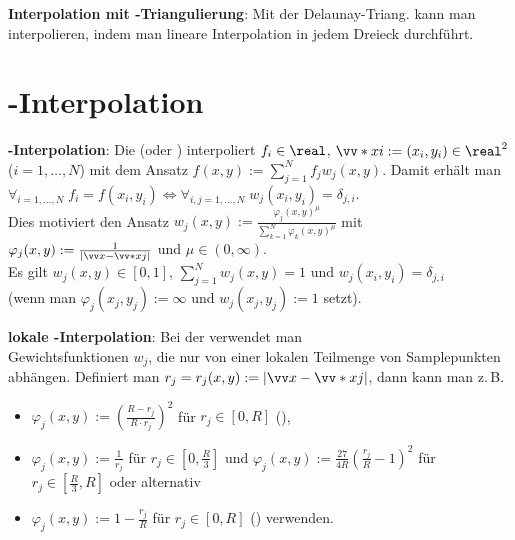 \textbf{Interpolation mit -Triangulierung}:
Mit der Delaunay-Triang. kann man interpolieren,
indem man lineare Interpolation in jedem Dreieck durchführt.

\section{%
    -Interpolation%
}

\textbf{-Interpolation}:
Die  (oder )
interpoliert $f_i \in \real$, $\vecs{x}{i} := (x_i, y_i) \in \real^2$ ($i = 1, \dotsc, N$)
mit dem Ansatz $f(x, y) := \sum_{j=1}^N f_j w_j(x, y)$.
Damit erhält man $\forall_{i=1,\dotsc,N}\; f_i = f(x_i, y_i) \iff
\forall_{i,j=1,\dotsc,N}\; w_j(x_i, y_i) = \delta_{j,i}$.\\
Dies motiviert den Ansatz
$w_j(x, y) := \frac{\varphi_j(x, y)^\mu}{\sum_{k=1}^N \varphi_k(x, y)^\mu}$ mit
$\varphi_j(x, y) := \frac{1}{|\vec{x} - \vecs{x}{j}|}$ und $\mu \in (0, \infty)$.\\
Es gilt $w_j(x, y) \in [0, 1]$, $\sum_{j=1}^N w_j(x, y) = 1$ und $w_j(x_i, y_i) = \delta_{j,i}$\\
(wenn man $\varphi_j(x_j, y_j) := \infty$ und $w_j(x_j, y_j) := 1$ setzt).

\linie

\textbf{lokale -Interpolation}:
Bei der  verwendet man\\
Gewichtsfunktionen $w_j$, die nur von einer lokalen Teilmenge von Samplepunkten abhängen.
Definiert man $r_j = r_j(x, y) := |\vec{x} - \vecs{x}{j}|$, dann
kann man z.\,B.
\begin{itemize}
    \item
    $\varphi_j(x, y) := \left(\frac{R - r_j}{R \cdot r_j}\right)^2$ für $r_j \in [0, R]$
    (),

    \item
    $\varphi_j(x, y) := \frac{1}{r_j}$ für $r_j \in [0, \frac{R}{3}]$ und
    $\varphi_j(x, y) := \frac{27}{4R} \left(\frac{r_j}{R} - 1\right)^2$ für
    $r_j \in [\frac{R}{3}, R]$ oder alternativ

    \item
    $\varphi_j(x, y) := 1 - \frac{r_j}{R}$ für $r_j \in [0, R]$
    () verwenden.
\end{itemize}

